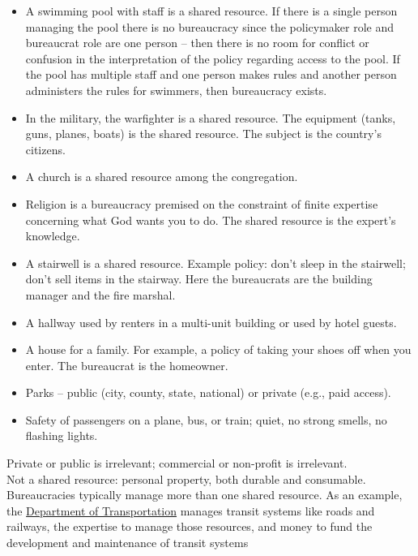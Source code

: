 {{\begin{itemize}
\item A swimming pool with staff is a shared resource. If there is a single person managing the pool there is no bureaucracy since the \gls{policymaker} role and bureaucrat role are one person -- then there is no room for conflict or confusion in the interpretation of the policy regarding access to the pool. If the pool has multiple staff and one person makes rules and another person administers the rules for swimmers, then bureaucracy exists.
\item In the military, the warfighter is a shared resource. The equipment (tanks, guns, planes, boats) is the shared resource. The subject is the country's citizens. 
\item A church is a shared resource among the congregation.
\item Religion is a bureaucracy premised on the constraint of finite expertise concerning what God wants you to do. The shared resource is the expert's knowledge.
\item A stairwell is a shared resource. Example policy: don't sleep in the stairwell; don't sell items in the stairway. Here the bureaucrats are the building manager and the fire marshal. 
\item A hallway used by renters in a multi-unit building or used by hotel guests.
\item A house for a family. For example, a policy of taking your shoes off when you enter. The bureaucrat is the homeowner.
\item Parks -- public (city, county, state, national) or private (e.g., paid access). 
\item Safety of passengers on a plane, bus, or train; quiet, no strong smells, no flashing lights.
\end{itemize}
Private or public is irrelevant; commercial or non-profit is irrelevant. \\
Not a shared resource: personal property, both durable and consumable. \\
Bureaucracies typically manage more than one shared resource.
As an example, the \href{https://en.wikipedia.org/wiki/Department_of_transportation}{Department of Transportation}
manages  transit systems like roads and railways, the expertise to manage those resources, and money to fund the development and maintenance of transit systems}
}


